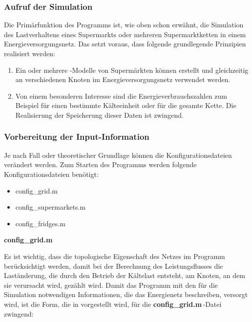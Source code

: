 \subsubsection{Aufruf der Simulation}%

Die Primärfunktion des Programms ist, wie oben schon erwähnt, die Simulation des
Lastverhaltens eines Supermarkts oder mehreren Supermarktketten in einem
Energieversorgungsnetz. Das setzt voraus, dass folgende grundlegende Prinzipien
realisiert werden:
\begin{enumerate}
	\item Ein oder mehrere \matlab-Modelle von Supermärkten können erstellt
	und gleichzeitig an verschiedenen Knoten im Energieversorgungsnetz
	verwendet werden.
	\item Von einem besonderen Interesse sind die Energieverbrauchszahlen
	zum Beispiel für einen bestimmte Kälteeinheit oder für die gesamte
	Kette. Die Realisierung der Speicherung dieser Daten ist zwingend.
\end{enumerate}

\subsubsection*{Vorbereitung der Input-Information}
\label{sec:input_infos}

Je nach Fall oder theoretischer Grundlage können die Konfigurationsdateien
verändert werden.  Zum Starten des Programms werden
folgende Konfigurationsdateien benötigt:

\begin{itemize}
	\item config\_grid.m
	\item config\_supermarkets.m
	\item config\_fridges.m
\end{itemize}
\vspace{3mm}
\noindent\textbf{config\_grid.m}
\vspace{3mm}

Es ist wichtig, dass die topologische Eigenschaft des Netzes im Programm
berücksichtigt werden, damit bei der Berechnung des Leistungsflusses die
Laständerung, die durch den Betrieb der Kältelast entsteht, am Knoten, an dem
sie verursacht wird, gezählt wird. Damit das Programm mit
den für die Simulation notwendigen Informationen, die das Energienetz
beschreiben, versorgt wird, ist die Form, die in  vorgestellt
wird, für die \textbf{config\_grid.m$\,$}-Datei zwingend:

